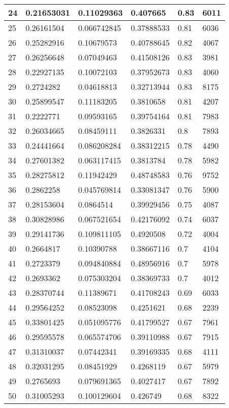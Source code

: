 \begin{longtable}{|l|l|l|l|l|l|}
24 & 0.21653031 & 0.11029363 & 0.407665 & 0.83 & 6011 \\ \hline 
25 & 0.26161504 & 0.066742845 & 0.37888533 & 0.81 & 6036 \\ \hline 
26 & 0.25282916 & 0.10679573 & 0.40788645 & 0.82 & 4067 \\ \hline 
27 & 0.26256648 & 0.07049463 & 0.41508126 & 0.83 & 3981 \\ \hline 
28 & 0.22927135 & 0.10072103 & 0.37952673 & 0.83 & 4060 \\ \hline 
29 & 0.2724282 & 0.04618813 & 0.32713944 & 0.83 & 8175 \\ \hline 
30 & 0.25899547 & 0.11183205 & 0.3810658 & 0.81 & 4207 \\ \hline 
31 & 0.2222771 & 0.09593165 & 0.39754164 & 0.81 & 7983 \\ \hline 
32 & 0.26034665 & 0.08459111 & 0.3826331 & 0.8 & 7893 \\ \hline 
33 & 0.24441664 & 0.086208284 & 0.38312215 & 0.78 & 4490 \\ \hline 
34 & 0.27601382 & 0.063117415 & 0.3813784 & 0.78 & 5982 \\ \hline 
35 & 0.28275812 & 0.11942429 & 0.48748583 & 0.76 & 9752 \\ \hline 
36 & 0.2862258 & 0.045769814 & 0.33081347 & 0.76 & 5900 \\ \hline 
37 & 0.28153604 & 0.0864514 & 0.39929456 & 0.75 & 4087 \\ \hline 
38 & 0.30828986 & 0.067521654 & 0.42176092 & 0.74 & 6037 \\ \hline 
39 & 0.29141736 & 0.109811105 & 0.4920508 & 0.72 & 4004 \\ \hline 
40 & 0.2664817 & 0.10390788 & 0.38667116 & 0.7 & 4104 \\ \hline 
41 & 0.2723379 & 0.094840884 & 0.48956916 & 0.7 & 5978 \\ \hline 
42 & 0.2693362 & 0.075303204 & 0.38369733 & 0.7 & 4012 \\ \hline 
43 & 0.28370744 & 0.11389671 & 0.41708243 & 0.69 & 6033 \\ \hline 
44 & 0.29564252 & 0.08523098 & 0.4251621 & 0.68 & 2239 \\ \hline 
45 & 0.33801425 & 0.051095776 & 0.41799527 & 0.67 & 7961 \\ \hline 
46 & 0.29595578 & 0.065574706 & 0.39110988 & 0.67 & 7915 \\ \hline 
47 & 0.31310037 & 0.07442341 & 0.39169335 & 0.68 & 4111 \\ \hline 
48 & 0.32031295 & 0.08451929 & 0.4268119 & 0.67 & 5979 \\ \hline 
49 & 0.2765693 & 0.079691365 & 0.4027417 & 0.67 & 7892 \\ \hline 
50 & 0.31005293 & 0.100129604 & 0.426749 & 0.68 & 8322 \\ \hline 
\end{longtable}